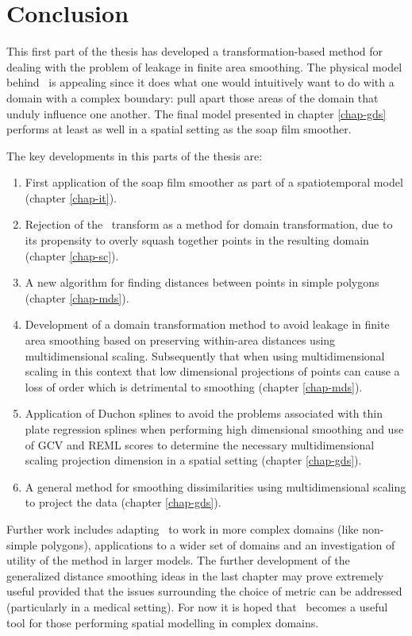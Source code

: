 \section{Conclusion}

This first part of the thesis has developed a transformation-based method for dealing with the problem of leakage in finite area smoothing. The physical model behind \mdsds\ is appealing since it does what one would intuitively want to do with a domain with a complex boundary: pull apart those areas of the domain that unduly influence one another. The final model presented in chapter \ref{chap-gds} performs at least as well in a spatial setting as the soap film smoother.

The key developments in this parts of the thesis are:
\begin{enumerate}
\item First application of the soap film smoother as part of a spatiotemporal model (chapter \ref{chap-it}).
\item Rejection of the \sch\ transform as a method for domain transformation, due to its propensity to overly squash together points in the resulting domain (chapter \ref{chap-sc}).
\item A new algorithm for finding distances between points in simple polygons (chapter \ref{chap-mds}).
\item Development of a domain transformation method to avoid leakage in finite area smoothing based on preserving within-area distances using multidimensional scaling. Subsequently that when using multidimensional scaling in this context that low dimensional projections of points can cause a loss of order which is detrimental to smoothing (chapter \ref{chap-mds}).
\item Application of Duchon splines to avoid the problems associated with thin plate regression splines when performing high dimensional smoothing and use of GCV and REML scores to determine the necessary multidimensional scaling projection dimension in a spatial setting (chapter \ref{chap-gds}).
\item A general method for smoothing dissimilarities using multidimensional scaling to project the data (chapter \ref{chap-gds}).
\end{enumerate}

Further work includes adapting \mdsds\ to work in more complex domains (like non-simple polygons), applications to a wider set of domains and an investigation of utility of the method in larger models. The further development of the generalized distance smoothing ideas in the last chapter may prove extremely useful provided that the issues surrounding the choice of metric can be addressed (particularly in a medical setting). For now it is hoped that \mdsds\ becomes a useful tool for those performing spatial modelling in complex domains.

